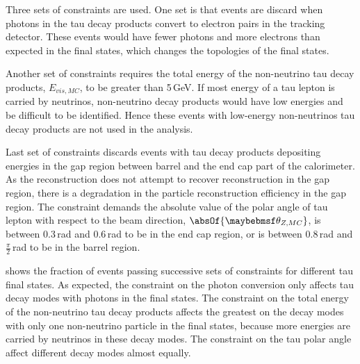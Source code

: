 Three sets of constraints are used. One set is that events are discard when photons in the tau decay products convert to electron pairs in the tracking detector. These events would have fewer photons and more electrons than expected in the final states, which changes the topologies of the final states.

Another set of constraints requires the total energy of the non-neutrino tau decay products, $E_{vis,MC}$, to be greater than 5\,GeV. If most energy of a tau lepton is carried by  neutrinos, non-neutrino decay products would have low energies and be difficult to be identified. Hence these events with low-energy non-neutrinos tau decay products are not used in the analysis.



Last set of constraints discards events with tau decay products depositing energies in the gap region between barrel and the end cap part of the calorimeter. As the reconstruction   does not attempt to recover reconstruction in the gap region, there is a degradation in the particle reconstruction efficiency in the gap region. The constraint demands the absolute value of the polar angle of tau lepton with respect to the beam direction, $\absOf{\theta_{Z,MC}}$, is between 0.3\,rad and 0.6\,rad to be  in the end cap region, or is between 0.8\,rad and $\frac{\pi}{2}$\,rad to be  in the barrel region.

 shows the fraction of events passing successive sets of constraints  for different tau final states.  As expected, the constraint on the photon conversion only affects tau decay modes with  photons in the final states. The constraint on the total energy of the non-neutrino tau decay products affects the greatest on the  decay modes with only one non-neutrino particle in the final states, because more energies are carried by neutrinos in these decay modes. The constraint on the tau polar angle affect different decay modes almost equally.




